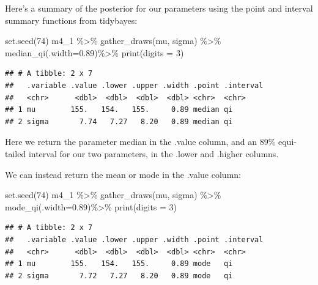 \documentclass[
]{book}
\newenvironment{Shaded}{\begin{snugshade}}{\end{snugshade}}
\newcommand{\AttributeTok}[1]{\textcolor[rgb]{0.77,0.63,0.00}{#1}}
\newcommand{\DecValTok}[1]{\textcolor[rgb]{0.00,0.00,0.81}{#1}}
\newcommand{\FloatTok}[1]{\textcolor[rgb]{0.00,0.00,0.81}{#1}}
\newcommand{\FunctionTok}[1]{\textcolor[rgb]{0.00,0.00,0.00}{#1}}
\newcommand{\NormalTok}[1]{#1}
\newcommand{\SpecialCharTok}[1]{\textcolor[rgb]{0.00,0.00,0.00}{#1}}
\begin{document}
Here's a summary of the posterior for our parameters using the point and interval summary functions from tidybayes:

\begin{Shaded}
\begin{Highlighting}[]
\FunctionTok{set.seed}\NormalTok{(}\DecValTok{74}\NormalTok{)}
\NormalTok{m4\_1 }\SpecialCharTok{\%\textgreater{}\%}
  \FunctionTok{gather\_draws}\NormalTok{(mu, sigma) }\SpecialCharTok{\%\textgreater{}\%}
  \FunctionTok{median\_qi}\NormalTok{(}\AttributeTok{.width=}\FloatTok{0.89}\NormalTok{)}\SpecialCharTok{\%\textgreater{}\%}
  \FunctionTok{print}\NormalTok{(}\AttributeTok{digits =} \DecValTok{3}\NormalTok{)}
\end{Highlighting}
\end{Shaded}

\begin{verbatim}
## # A tibble: 2 x 7
##   .variable .value .lower .upper .width .point .interval
##   <chr>      <dbl>  <dbl>  <dbl>  <dbl> <chr>  <chr>    
## 1 mu        155.   154.   155.     0.89 median qi       
## 2 sigma       7.74   7.27   8.20   0.89 median qi
\end{verbatim}

Here we return the parameter median in the .value column, and an 89\% equi-tailed interval for our two parameters, in the .lower and .higher columns.

We can instead return the mean or mode in the .value column:

\begin{Shaded}
\begin{Highlighting}[]
\FunctionTok{set.seed}\NormalTok{(}\DecValTok{74}\NormalTok{)}
\NormalTok{m4\_1 }\SpecialCharTok{\%\textgreater{}\%}
  \FunctionTok{gather\_draws}\NormalTok{(mu, sigma) }\SpecialCharTok{\%\textgreater{}\%}
  \FunctionTok{mode\_qi}\NormalTok{(}\AttributeTok{.width=}\FloatTok{0.89}\NormalTok{)}\SpecialCharTok{\%\textgreater{}\%}
  \FunctionTok{print}\NormalTok{(}\AttributeTok{digits =} \DecValTok{3}\NormalTok{)}
\end{Highlighting}
\end{Shaded}

\begin{verbatim}
## # A tibble: 2 x 7
##   .variable .value .lower .upper .width .point .interval
##   <chr>      <dbl>  <dbl>  <dbl>  <dbl> <chr>  <chr>    
## 1 mu        155.   154.   155.     0.89 mode   qi       
## 2 sigma       7.72   7.27   8.20   0.89 mode   qi
\end{verbatim}
\end{document}
